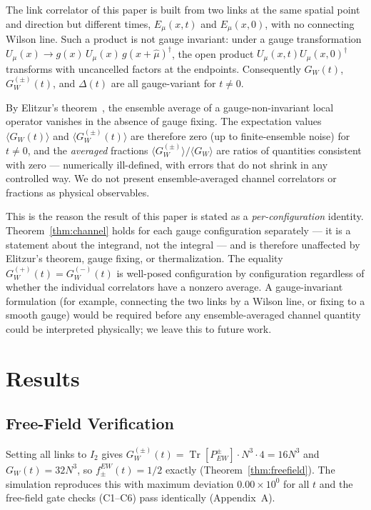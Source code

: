 \documentclass[12pt,a4paper]{article}
\newcommand{\Tr}{\operatorname{Tr}}
\newcommand{\Pew}[1]{P^{#1}_{\mathrm{EW}}}
\newcommand{\GW}[1]{G_W^{(#1)}}
\newcommand{\fEW}[1]{f_{#1}^{\mathrm{EW}}}
\def\mathrm#1{#1}%
\begin{document}
	The link correlator of this paper is built from two links at the same spatial point
	and direction but different times, $E_\mu(x,t)$ and $E_\mu(x,0)$, with no connecting
	Wilson line. Such a product is not gauge invariant: under a gauge transformation
	$U_\mu(x)\to g(x)\,U_\mu(x)\,g(x+\hat\mu)^\dagger$, the open product
	$U_\mu(x,t)U_\mu(x,0)^\dagger$ transforms with uncancelled factors at the endpoints.
	Consequently $G_W(t)$, $\GW{\pm}(t)$, and $\Delta(t)$ are all gauge-variant for
	$t\neq0$.
	
	By Elitzur's theorem~\cite{Elitzur1975}, the ensemble average of a gauge-non-invariant
	local operator vanishes in the absence of gauge fixing. The expectation values
	$\langle G_W(t)\rangle$ and $\langle\GW{\pm}(t)\rangle$ are therefore zero (up to
	finite-ensemble noise) for $t\neq0$, and the \emph{averaged} fractions
	$\langle\GW{\pm}\rangle/\langle G_W\rangle$ are ratios of quantities consistent with
	zero --- numerically ill-defined, with errors that do not shrink in any controlled
	way. We do not present ensemble-averaged channel correlators or fractions as physical
	observables.
	
	This is the reason the result of this paper is stated as a \emph{per-configuration}
	identity. Theorem~\ref{thm:channel} holds for each gauge configuration separately ---
	it is a statement about the integrand, not the integral --- and is therefore
	unaffected by Elitzur's theorem, gauge fixing, or thermalization. The equality
	$\GW{+}(t)=\GW{-}(t)$ is well-posed configuration by configuration regardless of
	whether the individual correlators have a nonzero average. A gauge-invariant
	formulation (for example, connecting the two links by a Wilson line, or fixing to a
	smooth gauge) would be required before any ensemble-averaged channel quantity could
	be interpreted physically; we leave this to future work.
	
	\section{Results}
	
\subsection{Free-Field Verification}
	\label{sec:results}
	
	Setting all links to $I_2$ gives $\GW{\pm}(t)=\Tr[\Pew{\pm}]\cdot N^3\cdot4=16N^3$
	and $G_W(t)=32N^3$, so $\fEW{\pm}(t)=1/2$ exactly (Theorem~\ref{thm:freefield}).
	The simulation reproduces this with maximum deviation $0.00\times10^0$ for all $t$
	and the free-field gate checks (C1--C6) pass identically (Appendix~A).
	
\end{document}
